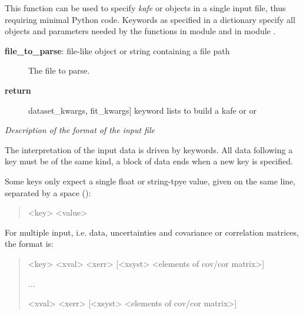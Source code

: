 \documentclass[a4paper,10pt,english]{sphinxmanual}
\begin{document}
\begin{fulllineitems}
\label{index:kafe.file_tools.parse_general_inputfile}
This function can be used to specify \emph{kafe} 
or  objects in a single input file, thus requiring
minimal Python code. Keywords as specified in a dictionary
 specify all objects and parameters needed by the
functions  in  module  and
 in module .
\begin{description}
\item[{\textbf{file\_to\_parse}:  file-like object or string containing a file path}] \leavevmode
The file to parse.

\item[{\textbf{return}}] \leavevmode{[}dataset\_kwargs, fit\_kwargs{]}
keyword lists to build a kafe  or  or 

\end{description}

\emph{Description of the format of the input file}

The interpretation of the input data is driven by keywords.
All data following a key must be of the same kind, a block of
data ends when a new key is specified.

Some keys only expect a single float or string-tpye value, given
on the same line, separated by a space ():
\begin{quote}

\textless{}key\textgreater{} \textless{}value\textgreater{}
\end{quote}

For multiple input, i.e. data, uncertainties and covariance or
correlation matrices, the format is:
\begin{quote}

\textless{}key\textgreater{}
\textless{}xval\textgreater{}  \textless{}xerr\textgreater{}  {[}\textless{}xsyst\textgreater{}  \textless{}elements of cov/cor matrix\textgreater{}{]}

...

\textless{}xval\textgreater{}  \textless{}xerr\textgreater{}  {[}\textless{}xsyst\textgreater{}  \textless{}elements of cov/cor matrix\textgreater{}{]}
\end{quote}


\end{fulllineitems}
\end{document}
